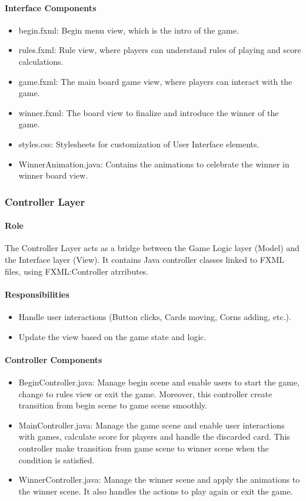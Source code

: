 \documentclass[conference]{IEEEtran}
\begin{document}
\paragraph{Interface Components}
\begin{itemize}
    \item begin.fxml: Begin menu view, which is the intro of the game.
    \item rules.fxml: Rule view, where players can understand rules of playing and score calculations.
    \item game.fxml: The main board game view, where players can interact with the game.
    \item winner.fxml: The board view to finalize and introduce the winner of the game.
    \item styles.css: Stylesheets for customization of User Interface elements.
    \item WinnerAnimation.java: Contains the animations to celebrate the winner in winner board view.
\end{itemize}

\subsubsection{Controller Layer}
\paragraph{Role}
The Controller Layer acts as a bridge between the Game Logic layer (Model) and the Interface layer (View). It contains Java controller classes linked to FXML files, using FXML:Controller atrributes.

\paragraph{Responsibilities}
\begin{itemize}
    \item Handle user interactions (Button clicks, Cards moving, Corns adding, etc.).
    \item Update the view based on the game state and logic.
\end{itemize}

\paragraph{Controller Components}
\begin{itemize}
    \item BeginController.java: Manage begin scene and enable users to start the game, change to rules view or exit the game. Moreover, this controller create transition from begin scene to game scene smoothly.
    \item MainController.java: Manage the game scene and enable user interactions with games, calculate score for players and handle the discarded card. This controller make transition  from game scene to winner scene when the condition is satisfied.
    \item WinnerController.java: Manage the winner scene and apply the animations to the winner scene. It also handles the actions to play again or exit the game.
\end{itemize}
\end{document}
